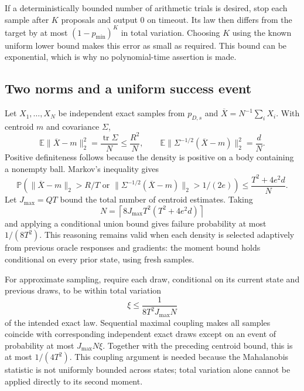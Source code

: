 \documentclass[11pt]{article}
\newcommand{\E}{\mathbb E}
\newcommand{\Prob}{\mathbb P}
\newcommand{\norm}[1]{\lVert #1\rVert}
\theoremstyle{definition}
\begin{document}
If a deterministically bounded number of arithmetic trials is desired,
stop each sample after $K$ proposals and output $0$ on timeout. Its law
then differs from the target by at most $(1-p_{\min})^K$ in total
variation. Choosing $K$ using the known uniform lower bound makes this
error as small as required. This bound can be exponential, which is why
no polynomial-time assertion is made.

\subsection{Two norms and a uniform success event}

Let $X_1,\ldots,X_N$ be independent exact samples from $p_{D,s}$ and
$\overline X=N^{-1}\sum_iX_i$. With centroid $m$ and covariance $\Sigma$,
\begin{equation}\label{eq:sample-moments}
 \E\norm{\overline X-m}_2^2
 =\frac{\operatorname{tr}\Sigma}{N}\le\frac{R^2}{N},
 \qquad
 \E\norm{\Sigma^{-1/2}(\overline X-m)}_2^2=\frac dN.
\end{equation}
Positive definiteness follows because the density is positive on a body
containing a nonempty ball. Markov's inequality gives
\[
 \Prob\!\left(\norm{\overline X-m}_2>R/T
 \text{ or }
 \norm{\Sigma^{-1/2}(\overline X-m)}_2>1/(2e)\right)
 \le\frac{T^2+4e^2d}{N}.
\]
Let $J_{\max}=QT$ bound the total number of centroid estimates. Taking
\begin{equation}\label{eq:N}
 N=\left\lceil8J_{\max}T^2(T^2+4e^2d)\right\rceil
\end{equation}
and applying a conditional union bound gives failure probability at most
$1/(8T^2)$. This reasoning remains valid when each density is selected
adaptively from previous oracle responses and gradients: the moment
bound holds conditional on every prior state, using fresh samples.

For approximate sampling, require each draw, conditional on its current
state and previous draws, to be within total variation
\[
 \xi\le\frac{1}{8T^2J_{\max}N}
\]
of the intended exact law. Sequential maximal coupling makes all samples
coincide with corresponding independent exact draws except on an event
of probability at most $J_{\max}N\xi$. Together with the preceding
centroid bound, this is at most $1/(4T^2)$.
This coupling argument is needed because the Mahalanobis statistic is
not uniformly bounded across states; total variation alone cannot be
applied directly to its second moment.
\end{document}
